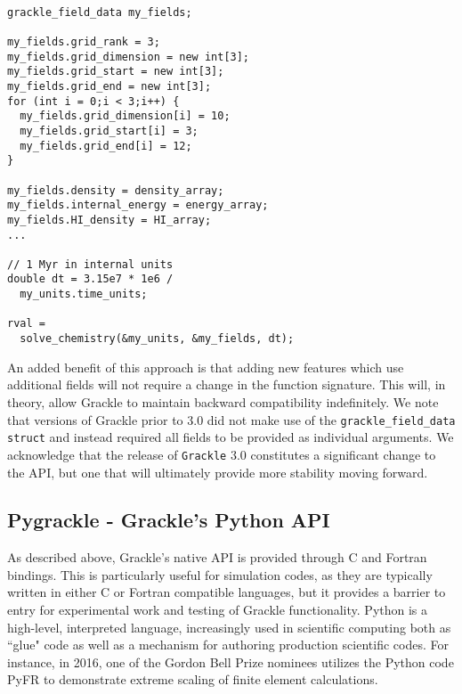 \vspace{0.5cm}
\begin{minipage}[b]{0.5\linewidth}
\begin{verbatim}

grackle_field_data my_fields;

my_fields.grid_rank = 3;
my_fields.grid_dimension = new int[3];
my_fields.grid_start = new int[3];
my_fields.grid_end = new int[3];
for (int i = 0;i < 3;i++) {
  my_fields.grid_dimension[i] = 10;
  my_fields.grid_start[i] = 3;
  my_fields.grid_end[i] = 12;
}

my_fields.density = density_array;
my_fields.internal_energy = energy_array;
my_fields.HI_density = HI_array;
...

// 1 Myr in internal units
double dt = 3.15e7 * 1e6 /
  my_units.time_units;

rval =
  solve_chemistry(&my_units, &my_fields, dt);

\end{verbatim}
\end{minipage}

An added benefit of this approach is that adding new
features which use additional fields will not require a change in the
function signature.  This will, in theory, allow Grackle to maintain
backward compatibility indefinitely.  We note that versions of Grackle
prior to 3.0 did not make use of the \texttt{grackle\_field\_data}
\texttt{struct} and instead required all fields to be provided as
individual arguments.  We acknowledge that the release of
\texttt{Grackle} 3.0 constitutes a significant change to the API, but
one that will ultimately provide more stability moving forward.

\subsection{Pygrackle - Grackle's Python API}

As described above, Grackle's native API is provided through C and Fortran
bindings.  This is particularly useful for simulation codes, as they are
typically written in either C or Fortran compatible languages, but it provides
a barrier to entry for experimental work and testing of Grackle functionality.
Python is a high-level, interpreted language, increasingly used in scientific
computing both as ``glue" code as well as a mechanism for authoring production
scientific codes.  For instance, in 2016, one of the Gordon Bell Prize nominees
utilizes the Python code PyFR to demonstrate extreme scaling of finite element
calculations.

